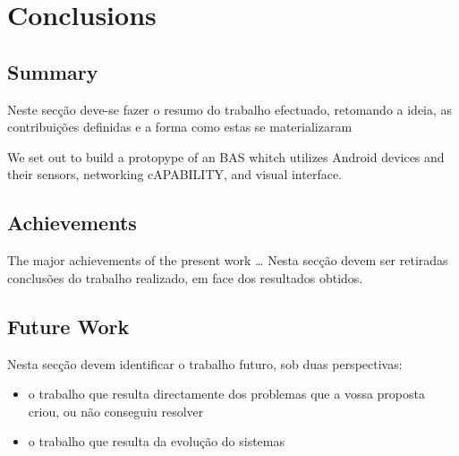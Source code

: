 \chapter{Conclusions}
\label{chapter:conclusion}

\section{Summary}
\label{section:summary}
Neste secção deve-se fazer o resumo do trabalho efectuado, retomando a ideia, as
contribuições definidas e a forma como estas se materializaram


We set out to build a protopype of an \ac{BAS} whitch utilizes Android devices and their sensors, networking cAPABILITY, and visual interface. 




\section{Achievements}
\label{section:achievements}
The major achievements of the present work \ldots
Nesta secção devem ser retiradas conclusões do trabalho realizado, em face dos
resultados obtidos.





\section{Future Work}
\label{section:future}
Nesta secção devem identificar o trabalho futuro, sob duas perspectivas:
\begin{itemize}
\item o trabalho que resulta directamente dos problemas que a vossa proposta criou, ou não conseguiu resolver
\item o trabalho que resulta da evolução do sistemas
\end{itemize}


\cleardoublepage
